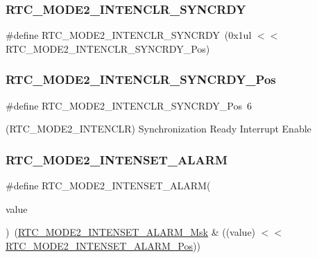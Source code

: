 \subsubsection{\texorpdfstring{RTC\_MODE2\_INTENCLR\_SYNCRDY}{RTC\_MODE2\_INTENCLR\_SYNCRDY}}
{\footnotesize\ttfamily \#define R\+T\+C\+\_\+\+M\+O\+D\+E2\+\_\+\+I\+N\+T\+E\+N\+C\+L\+R\+\_\+\+S\+Y\+N\+C\+R\+DY~(0x1ul $<$$<$ R\+T\+C\+\_\+\+M\+O\+D\+E2\+\_\+\+I\+N\+T\+E\+N\+C\+L\+R\+\_\+\+S\+Y\+N\+C\+R\+D\+Y\+\_\+\+Pos)}

\mbox{\label{group___s_a_m_d21___r_t_c_gae72ec25aaf199e98fbacbc76141e8af1}} 
\subsubsection{\texorpdfstring{RTC\_MODE2\_INTENCLR\_SYNCRDY\_Pos}{RTC\_MODE2\_INTENCLR\_SYNCRDY\_Pos}}
{\footnotesize\ttfamily \#define R\+T\+C\+\_\+\+M\+O\+D\+E2\+\_\+\+I\+N\+T\+E\+N\+C\+L\+R\+\_\+\+S\+Y\+N\+C\+R\+D\+Y\+\_\+\+Pos~6}



(R\+T\+C\+\_\+\+M\+O\+D\+E2\+\_\+\+I\+N\+T\+E\+N\+C\+LR) Synchronization Ready Interrupt Enable 

\mbox{\label{group___s_a_m_d21___r_t_c_ga9addc173b583e16aac0822df06005cbe}} 
\subsubsection{\texorpdfstring{RTC\_MODE2\_INTENSET\_ALARM}{RTC\_MODE2\_INTENSET\_ALARM}}
{\footnotesize\ttfamily \#define R\+T\+C\+\_\+\+M\+O\+D\+E2\+\_\+\+I\+N\+T\+E\+N\+S\+E\+T\+\_\+\+A\+L\+A\+RM(\begin{DoxyParamCaption}\item[{}]{value }\end{DoxyParamCaption})~(\mbox{\hyperlink{group___s_a_m_d21___r_t_c_ga399cab412d12907e9ec83e773af56fa6}{R\+T\+C\+\_\+\+M\+O\+D\+E2\+\_\+\+I\+N\+T\+E\+N\+S\+E\+T\+\_\+\+A\+L\+A\+R\+M\+\_\+\+Msk}} \& ((value) $<$$<$ \mbox{\hyperlink{group___s_a_m_d21___r_t_c_ga1158f1401ff9907c83fda3c449162e18}{R\+T\+C\+\_\+\+M\+O\+D\+E2\+\_\+\+I\+N\+T\+E\+N\+S\+E\+T\+\_\+\+A\+L\+A\+R\+M\+\_\+\+Pos}}))}

